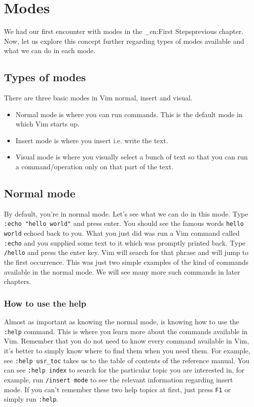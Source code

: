 \section{Modes}
We had our first encounter with modes in the \_en:First
Stepsprevious chapter. Now, let us explore this concept further regarding types
of modes available and what we can do in each mode. 

\subsection{Types of modes}
There are three basic modes in Vim  normal, insert and visual. 
\begin{itemize}
\item Normal mode is where you can run commands. This is the default mode in which Vim starts up. 
\item Insert mode is where you insert i.e. write the text. 
\item Visual mode is where you visually select a bunch of text so that you can run a command/operation only on
that part of the text. 
\end{itemize}

\subsection{Normal mode}
By default, you're in normal mode.
Let's see what we can do in this mode. Type \texttt{:echo "hello world"} and
press enter. You should see the famous words \texttt{hello world} echoed back
to you. What you just did was run a Vim command called \texttt{:echo} and you
supplied some text to it which was promptly printed back. Type \texttt{/hello}
and press the enter key. Vim will search for that phrase and will jump to the
first occurrence. This was just two simple examples of the kind of commands
available in the normal mode. We will see many more such commands in later
chapters. 

\subsubsection{How to use the help}
Almost as important as knowing the normal
mode, is knowing how to use the \texttt{:help} command. This is where you learn
more about the commands available in Vim. Remember that you do not need to know
every command available in Vim, it's better to simply know where to find them
when you need them. For example, see \texttt{:help usr\_toc} takes us to the
table of contents of the reference manual. You can see \texttt{:help index} to
search for the particular topic you are interested in, for example, run
\texttt{/insert mode} to see the relevant information regarding insert mode. If
you can't remember these two help topics at first, just press \texttt{F1} or
simply run \texttt{:help}. 


